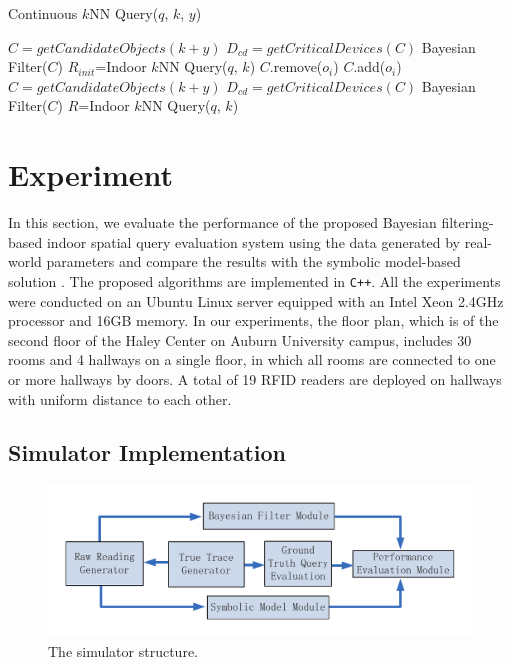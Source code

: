\documentclass[12pt]{report}
\begin{document}
\begin{algorithm}[!t]
  \caption{Continuous \(k\)NN Query(\(q\), \(k\), \(y\))}
  \label{alg:continuous-knn}
  \small
  \begin{algorithmic}[1]
    \STATE \(C=getCandidateObjects(k+y)\) \STATE
    \(D_{cd}=getCriticalDevices(C)\) \STATE Bayesian Filter(\(C\)) \STATE
    \(R_{init}\)=Indoor \(k\)NN Query(\(q\), \(k\))
    \STATE \(C\).remove(\(o_i\))
    \ELSE
    \STATE \(C\).add(\(o_i\))
    \ENDIF
    \ENDFOR
    \STATE \(C=getCandidateObjects(k+y)\)
    \STATE \(D_{cd}=getCriticalDevices(C)\)
    \ENDIF
    \STATE Bayesian Filter(\(C\))
    \STATE \(R\)=Indoor \(k\)NN Query(\(q\), \(k\))
    \ENDFOR
  \end{algorithmic}
\end{algorithm}

\part{Experiment}
\label{sec:experiment}
In this section, we evaluate the performance of the proposed
Bayesian filtering-based indoor spatial query evaluation system
using the data generated by real-world parameters and compare the
results with the symbolic model-based solution
\cite{yang2010-probabilistic}.  The proposed algorithms are
implemented in \texttt{C++}.  All the experiments were conducted on an
Ubuntu Linux server equipped with an Intel Xeon 2.4GHz processor and
16GB memory.  In our experiments, the floor plan, which is of the
second floor of the Haley Center on Auburn University campus,
includes 30 rooms and 4 hallways on a single floor, in which all
rooms are connected to one or more hallways by doors.  A total of 19
RFID readers are deployed on hallways with uniform distance to each
other.

\chapter{Simulator Implementation}
\label{sec:orgcaf1209}

\begin{figure}[htbp]
\centering
\includegraphics[width=.8\textwidth]{img/simulator-structure.pdf}
\caption{\label{fig:simulator-structure}
The simulator structure.}
\end{figure}
\end{document}
